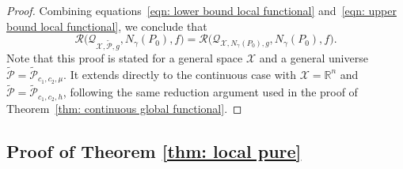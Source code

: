 \documentclass[accepted]{article}
\theoremstyle{plain} %
\theoremstyle{definition}
\theoremstyle{remark}
\newcommand{\eps}{\varepsilon}
\newcommand{\bQ}{\mathbf{Q}}
\newcommand{\Pth}
{\tilde{\mathcal{P}}_{c_1, c_2, h}}
\newcommand{\Ptm}
{\tilde{\mathcal{P}}_{c_1, c_2, \mu}}
\begin{document}
\begin{proof}
Combining equations~\eqref{eqn: lower bound local functional} and~\eqref{eqn: upper bound local functional}, 
we conclude that
\[
\mathcal{R}\Big(\mathcal{Q}_{\mathcal{X}, \tilde{\mathcal{P}}, g}, N_\gamma(P_0), f\Big) 
= \mathcal{R}\Big(\mathcal{Q}_{\mathcal{X}, N_\gamma(P_0), g}, N_\gamma(P_0), f\Big).
\]
Note that this proof is stated for a general space \(\mathcal{X}\) and a general universe \(\tilde{\mathcal{P}} = \Ptm\). It extends directly to the continuous case with \(\mathcal{X} = \mathbb{R}^n\) and \(\tilde{\mathcal{P}} = \Pth\), following the same reduction argument used in the proof of Theorem~\ref{thm: continuous global functional}.
\end{proof}


\subsection{Proof of Theorem \ref{thm: local pure}} \label{proof: local pure}
\end{document}
